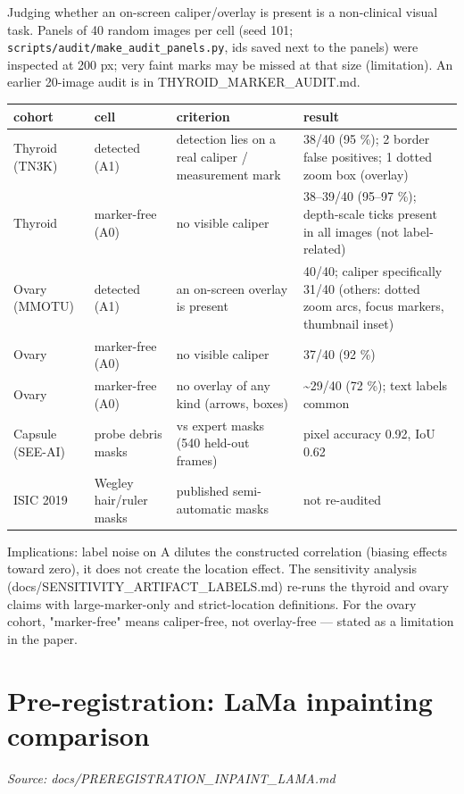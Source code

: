 {\small
Judging whether an on-screen caliper/overlay is present is a non-clinical visual task. Panels of 40 random images
per cell (seed 101; \texttt{scripts/audit/make\_audit\_panels.py}, ids saved next to the panels) were inspected at 200 px;
very faint marks may be missed at that size (limitation). An earlier 20-image audit is in THYROID\_MARKER\_AUDIT.md.

{ %
\begin{longtable}[]{@{}llll@{}}
\toprule\noalign{}
cohort & cell & criterion & result \\
\midrule\noalign{}
\endhead
\bottomrule\noalign{}
\endlastfoot
Thyroid (TN3K) & detected (A1) & detection lies on a real caliper / measurement mark & 38/40 (95 \%); 2 border false positives; 1 dotted zoom box (overlay) \\
Thyroid & marker-free (A0) & no visible caliper & 38--39/40 (95--97 \%); depth-scale ticks present in all images (not label-related) \\
Ovary (MMOTU) & detected (A1) & an on-screen overlay is present & 40/40; caliper specifically 31/40 (others: dotted zoom arcs, focus markers, thumbnail inset) \\
Ovary & marker-free (A0) & no visible caliper & 37/40 (92 \%) \\
Ovary & marker-free (A0) & no overlay of any kind (arrows, boxes) & \textasciitilde29/40 (72 \%); text labels common \\
Capsule (SEE-AI) & probe debris masks & vs expert masks (540 held-out frames) & pixel accuracy 0.92, IoU 0.62 \\
ISIC 2019 & Wegley hair/ruler masks & published semi-automatic masks & not re-audited \\
\end{longtable}
}

Implications: label noise on A dilutes the constructed correlation (biasing effects toward zero), it does not create
the location effect. The sensitivity analysis (docs/SENSITIVITY\_ARTIFACT\_LABELS.md) re-runs the thyroid and ovary
claims with large-marker-only and strict-location definitions. For the ovary cohort, "marker-free" means
caliper-free, not overlay-free --- stated as a limitation in the paper.

}

\section{Pre-registration: LaMa inpainting comparison}\label{doc:PREREGISTRATION_INPAINT_LAMA}
\noindent\textit{Source: docs/PREREGISTRATION\_INPAINT\_LAMA.md}

